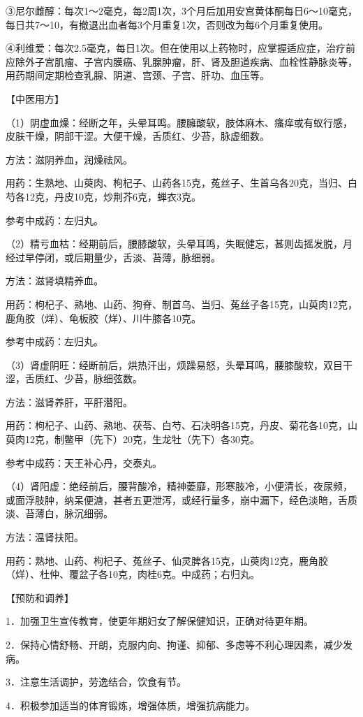 \documentclass[12pt,UTF8]{ctexbook}
\begin{document}
③尼尔雌醇：每次1～2毫克，每2周1次，3个月后加用安宫黄体酮每日6～10毫克，每日共7～10，有撤退出血者每3个月重复1次，否则改为每6个月重复使用。

④利维爱：每次2.5毫克，每日1次。但在使用以上药物时，应掌握适应症，治疗前应除外子宫肌瘤、子宫内膜癌、乳腺肿瘤，肝、肾及胆道疾病、血栓性静脉炎等，用药期间定期检查乳腺、阴道、宫颈、子宫、肝功、血压等。

【中医用方】

（1）阴虚血燥：经断之年，头晕耳鸣。腰臃酸软，肢体麻木、瘙痒或有蚁行感，皮肤干燥，阴部干涩。大便干燥，舌质红、少苔，脉虚细数。

方法：滋阴养血，润燥祛风。

用药：生熟地、山萸肉、枸杞子、山药各15克，菟丝子、生首乌各20克，当归、白芍各12克，丹皮10克，炒荆芥6克，蝉衣3克。

参考中成药：左归丸。

（2）精亏血枯：经期前后，腰膝酸软，头晕耳鸣，失眠健忘，甚则齿摇发脱，月经过早停闭，或后期量少，舌淡、苔薄，脉细弱。

方法：滋肾填精养血。

用药：枸杞子、熟地、山药、狗脊、制首乌、当归、菟丝子各15克，山萸肉12克，鹿角胶（烊）、龟板胶（烊）、川牛膝各10克。

参考中成药：左归丸。

（3）肾虚阴旺：经断前后，烘热汗出，烦躁易怒，头晕耳鸣，腰膝酸软，双目干涩，舌质红、少苔，脉细弦数。

方法：滋肾养肝，平肝潜阳。

用药：枸杞子、山药、熟地、茯苓、白芍、石决明各15克，丹皮、菊花各10克，山萸肉12克，制鳖甲（先下）20克，生龙牡（先下）各30克。

参考中成药：天王补心丹，交泰丸。

（4）肾阳虚：绝经前后，腰背酸冷，精神萎靡，形寒肢冷，小便清长，夜尿频，或面浮肢肿，纳呆便溏，甚者五更泄泻，或经行量多，崩中漏下，经色淡暗，舌质淡、苔薄白，脉沉细弱。

方法：温肾扶阳。

用药：熟地、山药、枸杞子、菟丝子、仙灵脾各15克，山萸肉12克，鹿角胶（烊）、杜仲、覆盆子各10克，肉桂6克。中成药；右归丸。

【预防和调养】

1．加强卫生宣传教育，使更年期妇女了解保健知识，正确对待更年期。

2．保持心情舒畅、开朗，克服内向、拘谨、抑郁、多虑等不利心理因素，减少发病。

3．注意生活调护，劳逸结合，饮食有节。

4．积极参加适当的体育锻炼，增强体质，增强抗病能力。
\end{document}
